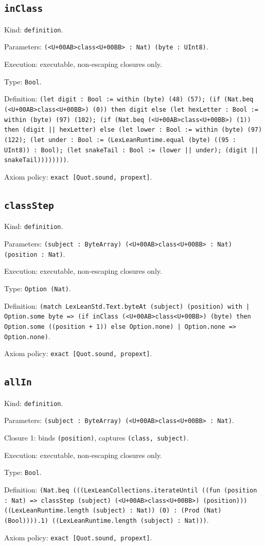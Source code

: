 \documentclass[11pt]{article}
\begin{document}
\subsection*{\texttt{inClass}}
\noindent Kind: \texttt{definition}.\par
\noindent Parameters: \texttt{(<U+00AB>class<U+00BB> : Nat) (byte : UInt8)}.\par
\noindent Execution: executable, non-escaping closures only.\par
\noindent Type: \texttt{Bool}.\par
\noindent Definition: \texttt{(let digit : Bool := within (byte) (48) (57); (if (Nat.beq (<U+00AB>class<U+00BB>) (0)) then digit else (let hexLetter : Bool := within (byte) (97) (102); (if (Nat.beq (<U+00AB>class<U+00BB>) (1)) then (digit || hexLetter) else (let lower : Bool := within (byte) (97) (122); (let under : Bool := (LexLeanRuntime.equal (byte) ((95 : UInt8)) : Bool); (let snakeTail : Bool := (lower || under); (digit || snakeTail))))))))}.\par
\noindent Axiom policy: \texttt{exact [Quot.sound, propext]}.\par
\subsection*{\texttt{classStep}}
\noindent Kind: \texttt{definition}.\par
\noindent Parameters: \texttt{(subject : ByteArray) (<U+00AB>class<U+00BB> : Nat) (position : Nat)}.\par
\noindent Execution: executable, non-escaping closures only.\par
\noindent Type: \texttt{Option (Nat)}.\par
\noindent Definition: \texttt{(match LexLeanStd.Text.byteAt (subject) (position) with | Option.some byte => (if inClass (<U+00AB>class<U+00BB>) (byte) then Option.some ((position + 1)) else Option.none) | Option.none => Option.none)}.\par
\noindent Axiom policy: \texttt{exact [Quot.sound, propext]}.\par
\subsection*{\texttt{allIn}}
\noindent Kind: \texttt{definition}.\par
\noindent Parameters: \texttt{(subject : ByteArray) (<U+00AB>class<U+00BB> : Nat)}.\par
\noindent Closure 1: binds \texttt{(position)}, captures \texttt{(class, subject)}.\par
\noindent Execution: executable, non-escaping closures only.\par
\noindent Type: \texttt{Bool}.\par
\noindent Definition: \texttt{(Nat.beq (((LexLeanCollections.iterateUntil ((fun (position : Nat) => classStep (subject) (<U+00AB>class<U+00BB>) (position))) ((LexLeanRuntime.length (subject) : Nat)) (0) : (Prod (Nat) (Bool)))).1) ((LexLeanRuntime.length (subject) : Nat)))}.\par
\noindent Axiom policy: \texttt{exact [Quot.sound, propext]}.\par
\end{document}
